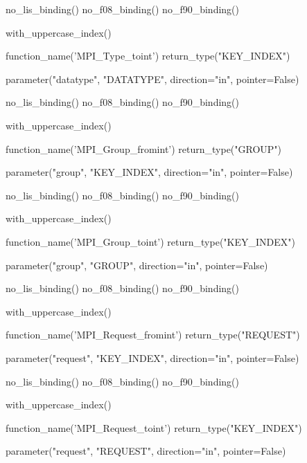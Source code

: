 \begin{mpi-binding}
    no_lis_binding()
    no_f08_binding()
    no_f90_binding()

    with_uppercase_index()

    function_name('MPI_Type_toint')
    return_type("KEY_INDEX")

    parameter("datatype", "DATATYPE", direction="in", pointer=False)
\end{mpi-binding}

%

\begin{mpi-binding}
    no_lis_binding()
    no_f08_binding()
    no_f90_binding()

    with_uppercase_index()

    function_name('MPI_Group_fromint')
    return_type("GROUP")

    parameter("group", "KEY_INDEX", direction="in", pointer=False)
\end{mpi-binding}

%
\begin{mpi-binding}
    no_lis_binding()
    no_f08_binding()
    no_f90_binding()

    with_uppercase_index()

    function_name('MPI_Group_toint')
    return_type("KEY_INDEX")

    parameter("group", "GROUP", direction="in", pointer=False)
\end{mpi-binding}

%
\begin{mpi-binding}
    no_lis_binding()
    no_f08_binding()
    no_f90_binding()

    with_uppercase_index()

    function_name('MPI_Request_fromint')
    return_type("REQUEST")

    parameter("request", "KEY_INDEX", direction="in", pointer=False)
\end{mpi-binding}

%
\begin{mpi-binding}
    no_lis_binding()
    no_f08_binding()
    no_f90_binding()

    with_uppercase_index()

    function_name('MPI_Request_toint')
    return_type("KEY_INDEX")

    parameter("request", "REQUEST", direction="in", pointer=False)
\end{mpi-binding}

